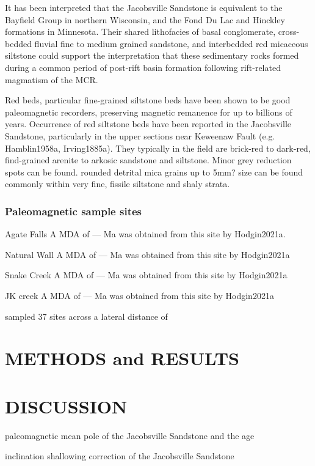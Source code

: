 \documentclass[draft]{agujournal2019}
\begin{document}
It has been interpreted that the Jacobsville Sandstone is equivalent to the Bayfield Group in northern Wisconsin, and the Fond Du Lac and Hinckley formations in Minnesota. Their shared lithofacies of basal conglomerate, cross-bedded fluvial fine to medium grained sandstone, and interbedded red micaceous siltstone could  support the interpretation that these sedimentary rocks formed during a common period of post-rift basin formation following rift-related magmatism of the MCR. 

Red beds, particular fine-grained siltstone beds have been shown to be good paleomagnetic recorders, preserving magnetic remanence for up to billions of years. Occurrence of red siltstone beds have been reported in the Jacobsville Sandstone, particularly in the upper sections near Keweenaw Fault (e.g. Hamblin1958a, Irving1885a). They typically in the field are brick-red to dark-red, find-grained arenite to arkosic sandstone and siltstone. Minor grey reduction spots can be found. rounded detrital mica grains up to 5mm? size can be found commonly within very fine, fissile siltstone and shaly strata. 


\subsubsection{Paleomagnetic sample sites}
Agate Falls
A MDA of --- Ma was obtained from this site by Hodgin2021a. 

Natural Wall
A MDA of --- Ma was obtained from this site by Hodgin2021a

Snake Creek
A MDA of --- Ma was obtained from this site by Hodgin2021a

JK creek
A MDA of --- Ma was obtained from this site by Hodgin2021a



\cite{Roy1978a} sampled 37 sites across a lateral distance of 


\section*{METHODS and RESULTS}



\section*{DISCUSSION}

paleomagnetic mean pole of the Jacobsville Sandstone and the age

inclination shallowing correction of the Jacobsville Sandstone
\end{document}
